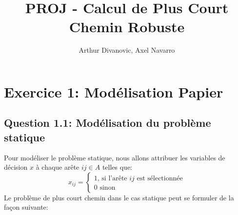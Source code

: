 \documentclass{article}
\title{PROJ - Calcul de Plus Court Chemin Robuste}
\author{Arthur Divanovic, Axel Navarro}
\begin{document}
\maketitle



\newpage
\tableofcontents

\newpage 
\section{Exercice 1: Modélisation Papier}

\subsection{Question 1.1: Modélisation du problème statique}

Pour modéliser le problème statique, nous allons attribuer les variables de décision $x$ à chaque arête $ij \in A$ telles que:
$$  x_{ij} = 
\begin{cases}
  1 \text{, si l'arête $ij$ est sélectionnée} \\
    0 \text{ sinon}
\end{cases}$$
Le problème de plus court chemin dans le cas statique peut se formuler de la façon suivante:
\end{document}
